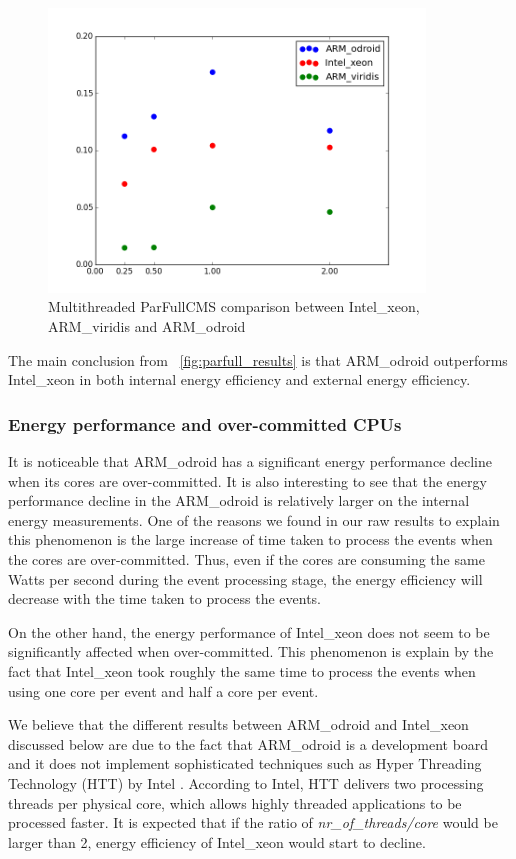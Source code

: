 \begin{figure}[h]
  \centering
    \includegraphics[width=100mm]{"img/aalto/parfull_results_aalto"}
    \caption{Multithreaded ParFullCMS comparison between Intel\_xeon, ARM\_viridis and ARM\_odroid}
    \label{fig:parfull_results_aalto}
\end{figure}

The main conclusion from ~\ref{fig:parfull_results} is that ARM\_odroid outperforms Intel\_xeon in both internal energy efficiency and external energy efficiency.

\subsubsection*{Energy performance and over-committed CPUs}

It is noticeable that ARM\_odroid has a significant energy performance decline when its cores are over-committed. It is also interesting to see that the energy performance decline in the ARM\_odroid is relatively larger on the internal energy measurements. One of the reasons we found in our raw results to explain this phenomenon is the large increase of time taken to process the events when the cores are over-committed. Thus, even if the cores are consuming the same Watts per second during the event processing stage, the energy efficiency will decrease with the time taken to process the events.  

On the other hand, the energy performance of Intel\_xeon does not seem to be significantly affected when over-committed. This phenomenon is explain by the fact that Intel\_xeon took roughly the same time to process the events when using one core per event and half a core per event.

We believe that the different results between ARM\_odroid and Intel\_xeon discussed below are due to the fact that ARM\_odroid is a development board and it does not implement sophisticated techniques such as Hyper Threading Technology (HTT) by Intel \cite{HTT}. According to Intel, HTT delivers two processing threads per physical core, which allows highly threaded applications to be processed faster. It is expected that if the ratio of  \textit{nr\_of\_threads/core} would be larger than 2, energy efficiency of Intel\_xeon would start to decline.  

